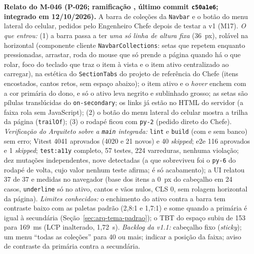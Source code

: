 \noindent{}\quad \textbf{Relato do M-046 (P-026; ramificação , último commit \texttt{c50a1e6}; integrado em 12/10/2026).} A barra de coleções da \texttt{Navbar} e o botão do menu lateral do celular, pedidos pelo Engenheiro Chefe depois de testar a v1 (M17). \emph{O que entrou:} (1) a barra passa a ter \emph{uma só linha de altura fixa} (36~px), rolável na horizontal (componente cliente \texttt{NavbarCollections}: setas que repetem enquanto pressionadas, arrastar, roda do mouse que só prende a página quando há o que rolar, foco do teclado que traz o item à vista e o item ativo centralizado ao carregar), na estética do \texttt{SectionTabs} do projeto de referência do Chefe (itens encostados, cantos retos, sem espaço abaixo); o item ativo e o \emph{hover} enchem com a cor primária do dono, e só o ativo leva negrito e sublinhado grosso; as setas são pílulas translúcidas do \texttt{on-secondary}; os links já estão no HTML do servidor (a faixa rola sem JavaScript); (2) o botão do menu lateral do celular mostra a trilha da página (\texttt{trailOf}); (3) o rodapé ficou com \texttt{py-2} (pedido direto do Chefe). \emph{Verificação do Arquiteto sobre a \texttt{main} integrada:} \texttt{lint} e \texttt{build} (com e sem banco) sem erro; Vitest 4041 aprovados (4020 e 21 novos) e 40 \emph{skipped}; e2e 116 aprovados e 1 \emph{skipped}; \texttt{test:a11y} completo, 57 testes, 224 varreduras, nenhuma violação; dez mutações independentes, nove detectadas (a que sobreviveu foi o \texttt{py-6} do rodapé de volta, cujo valor nenhum teste afirma; é só acabamento); a UI relatou 37 de 37 e medidas no navegador (base dos itens a 0~px do cabeçalho em 24 casos, \texttt{underline} só no ativo, cantos e vãos nulos, CLS 0, sem rolagem horizontal da página). \emph{Limites conhecidos:} o enchimento do ativo contra a barra tem contraste baixo com as paletas padrão (2,8:1 e 1,7:1) e some quando a primária é igual à secundária (Seção~\ref{sec:arq-tema-padrao}); o TBT do espaço subiu de 153 para 169~ms (LCP inalterado, 1,72~s). \emph{Backlog da v1.1:} cabeçalho fixo (\emph{sticky}); um menu ``todas as coleções'' para 40 ou mais; indicar a posição da faixa; aviso de contraste da primária contra a secundária.

